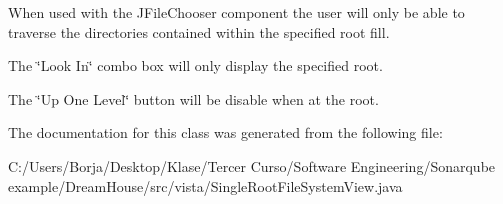 When used with the J\+File\+Chooser component the user will only be able to traverse the directories contained within the specified root fill.

The \char`\"{}\+Look In\char`\"{} combo box will only display the specified root.

The \char`\"{}\+Up One Level\char`\"{} button will be disable when at the root. 

The documentation for this class was generated from the following file\+:\begin{DoxyCompactItemize}
\item 
C\+:/\+Users/\+Borja/\+Desktop/\+Klase/\+Tercer Curso/\+Software Engineering/\+Sonarqube example/\+Dream\+House/src/vista/Single\+Root\+File\+System\+View.\+java\end{DoxyCompactItemize}
